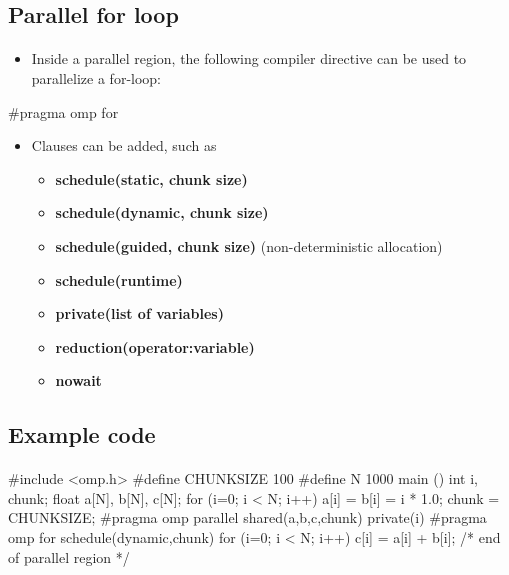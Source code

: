 \documentclass[%
oneside,                 %
final,                   %
10pt]{article}
\begin{document}
\noindent



\subsection{Parallel for loop}

\paragraph{}
\begin{itemize}
 \item Inside a parallel region, the following compiler directive can be used to parallelize a for-loop:
\end{itemize}

\noindent
\bcppcod
#pragma omp for
\ecppcod
\begin{itemize}
\item Clauses can be added, such as
\begin{itemize}

  \item \textbf{schedule(static, chunk size)}

  \item \textbf{schedule(dynamic, chunk size)} 

  \item \textbf{schedule(guided, chunk size)} (non-deterministic allocation)

  \item \textbf{schedule(runtime)}

  \item \textbf{private(list of variables)}

  \item \textbf{reduction(operator:variable)}

  \item \textbf{nowait}
\end{itemize}

\noindent
\end{itemize}

\noindent



\subsection{Example code}

\paragraph{}
\bcppcod
#include <omp.h>
#define CHUNKSIZE 100
#define N
1000
main ()
{
int i, chunk;
float a[N], b[N], c[N];
for (i=0; i < N; i++)
a[i] = b[i] = i * 1.0;
chunk = CHUNKSIZE;
#pragma omp parallel shared(a,b,c,chunk) private(i)
{
#pragma omp for schedule(dynamic,chunk)
for (i=0; i < N; i++)
c[i] = a[i] + b[i];
} /* end of parallel region */
}
\ecppcod
\end{document}
